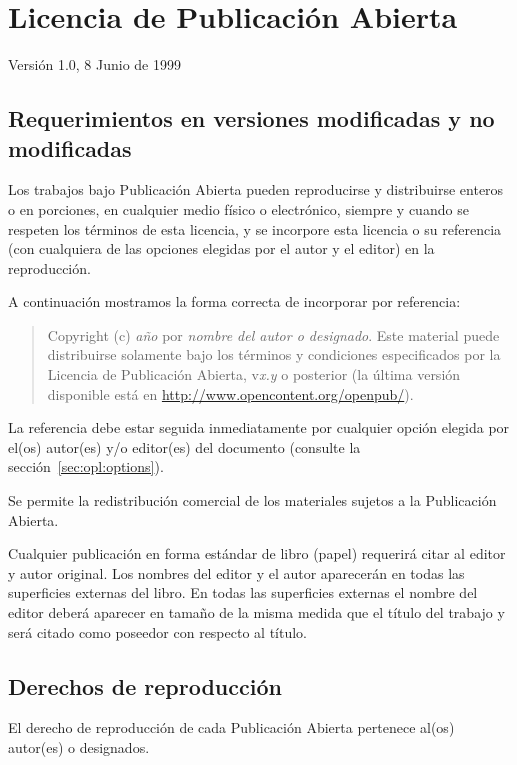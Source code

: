 \chapter{Licencia de Publicación Abierta}
\label{cha:opl}

Versión 1.0, 8 Junio de 1999

\section{Requerimientos en versiones modificadas y no modificadas}

Los trabajos bajo Publicación Abierta pueden reproducirse y
distribuirse enteros o en porciones, en cualquier medio físico o
electrónico, siempre y cuando se respeten los términos de esta 
licencia, y se incorpore esta licencia o su referencia (con cualquiera
de las opciones elegidas por el autor y el editor) en la reproducción.

A continuación mostramos la forma correcta de incorporar por referencia:

\begin{quote}
  Copyright (c) \emph{año} por \emph{nombre del autor o designado}.
  Este material puede distribuirse solamente bajo los términos y
  condiciones especificados por la Licencia de Publicación Abierta,
  v\emph{x.y} o  posterior (la última versión disponible está en
  \url{http://www.opencontent.org/openpub/}).
\end{quote}

La referencia debe estar seguida inmediatamente por cualquier opción
elegida por el(os) autor(es) y/o editor(es) del documento (consulte la
sección~\ref{sec:opl:options}).

Se permite la redistribución comercial de los materiales sujetos a la
Publicación Abierta.

Cualquier publicación en forma estándar de libro (papel) requerirá
citar al editor y autor original.  Los nombres del editor y el autor
aparecerán en todas las superficies externas del libro.  En todas las
superficies externas el nombre del editor deberá aparecer en tamaño de
la misma medida que el título del trabajo y será citado como poseedor
con respecto al título.

\section{Derechos de reproducción}

El derecho de reproducción de cada Publicación Abierta pertenece
al(os) autor(es) o designados.

